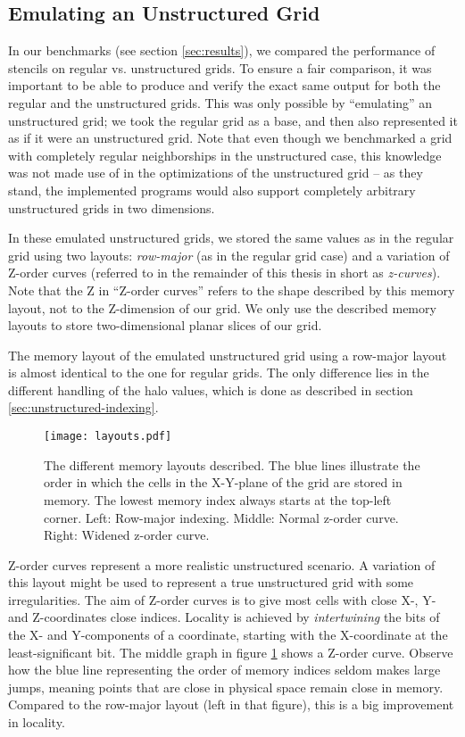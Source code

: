 \subsection{Emulating an Unstructured Grid} \label{sec:emulating}

In our benchmarks (see section \ref{sec:results}), we compared the performance of stencils on regular vs. unstructured grids. To ensure a fair comparison, it was important to be able to produce and verify the exact same output for both the regular and the unstructured grids. This was only possible by ``emulating'' an unstructured grid; we took the regular grid as a base, and then also represented it as if it were an unstructured grid. Note that even though we benchmarked a grid with completely regular neighborships in the unstructured case, this knowledge was not made use of in the optimizations of the unstructured grid -- as they stand, the implemented programs would also support completely arbitrary unstructured grids in two dimensions.

In these emulated unstructured grids, we stored the same values as in the regular grid using two layouts: \emph{row-major} (as in the regular grid case) and a variation of Z-order curves (referred to in the remainder of this thesis in short as \emph{z-curves}). Note that the Z in ``Z-order curves'' refers to the shape described by this memory layout, not to the Z-dimension of our grid. We only use the described memory layouts to store two-dimensional planar slices of our grid.

The memory layout of the emulated unstructured grid using a row-major layout is almost identical to the one for regular grids. The only difference lies in the different handling of the halo values, which is done as described in section \ref{sec:unstructured-indexing}. 

\begin{figure}
	\begin{center}
    \texttt{[image: layouts.pdf]}
	\end{center}
    \caption{\label{fig:layouts} The different memory layouts described. The blue lines illustrate the order in which the cells in the X-Y-plane of the grid are stored in memory. The lowest memory index always starts at the top-left corner. Left: Row-major indexing. Middle: Normal z-order curve. Right: Widened z-order curve.}
\end{figure}

Z-order curves\cite{wiki:z-curves} represent a more realistic unstructured scenario. A variation of this layout might be used to represent a true unstructured grid with some irregularities. The aim of Z-order curves is to give most cells with close X-, Y- and Z-coordinates close indices. Locality is achieved by \emph{intertwining} the bits of the X- and Y-components of a coordinate, starting with the X-coordinate at the least-significant bit. The middle graph in figure \ref{fig:layouts} shows a Z-order curve. Observe how the blue line representing the order of memory indices seldom makes large jumps, meaning points that are close in physical space remain close in memory. Compared to the row-major layout (left in that figure), this is a big improvement in locality.

